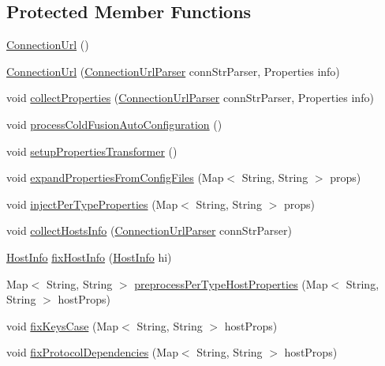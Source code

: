 \subsection*{Protected Member Functions}
\begin{DoxyCompactItemize}
\item 
\mbox{\hyperlink{classcom_1_1mysql_1_1cj_1_1conf_1_1_connection_url_ad72b3641e2d853e94c369c4706eb5c8b}{Connection\+Url}} ()
\item 
\mbox{\hyperlink{classcom_1_1mysql_1_1cj_1_1conf_1_1_connection_url_aea5acae1987c16d32135ad4be9eb5e1f}{Connection\+Url}} (\mbox{\hyperlink{classcom_1_1mysql_1_1cj_1_1conf_1_1_connection_url_parser}{Connection\+Url\+Parser}} conn\+Str\+Parser, Properties info)
\item 
void \mbox{\hyperlink{classcom_1_1mysql_1_1cj_1_1conf_1_1_connection_url_a95514a35cecb2df9fd97562e37405447}{collect\+Properties}} (\mbox{\hyperlink{classcom_1_1mysql_1_1cj_1_1conf_1_1_connection_url_parser}{Connection\+Url\+Parser}} conn\+Str\+Parser, Properties info)
\item 
void \mbox{\hyperlink{classcom_1_1mysql_1_1cj_1_1conf_1_1_connection_url_a30a037d919173bb9304abc41125093ce}{process\+Cold\+Fusion\+Auto\+Configuration}} ()
\item 
void \mbox{\hyperlink{classcom_1_1mysql_1_1cj_1_1conf_1_1_connection_url_a1c0bd7599f4e19698b01e25e11fc4686}{setup\+Properties\+Transformer}} ()
\item 
void \mbox{\hyperlink{classcom_1_1mysql_1_1cj_1_1conf_1_1_connection_url_a1029263b45f093075865f542e2d0fe87}{expand\+Properties\+From\+Config\+Files}} (Map$<$ String, String $>$ props)
\item 
void \mbox{\hyperlink{classcom_1_1mysql_1_1cj_1_1conf_1_1_connection_url_a7898c43cc847ca9819dfc98d96089563}{inject\+Per\+Type\+Properties}} (Map$<$ String, String $>$ props)
\item 
void \mbox{\hyperlink{classcom_1_1mysql_1_1cj_1_1conf_1_1_connection_url_acab0ee9a544e643d843f1d1e82052a0b}{collect\+Hosts\+Info}} (\mbox{\hyperlink{classcom_1_1mysql_1_1cj_1_1conf_1_1_connection_url_parser}{Connection\+Url\+Parser}} conn\+Str\+Parser)
\item 
\mbox{\hyperlink{classcom_1_1mysql_1_1cj_1_1conf_1_1_host_info}{Host\+Info}} \mbox{\hyperlink{classcom_1_1mysql_1_1cj_1_1conf_1_1_connection_url_a774f5a5e265ff12c8ea94e1c380e1b7a}{fix\+Host\+Info}} (\mbox{\hyperlink{classcom_1_1mysql_1_1cj_1_1conf_1_1_host_info}{Host\+Info}} hi)
\item 
Map$<$ String, String $>$ \mbox{\hyperlink{classcom_1_1mysql_1_1cj_1_1conf_1_1_connection_url_a7fd201bea071685e2344dc0701b0fb21}{preprocess\+Per\+Type\+Host\+Properties}} (Map$<$ String, String $>$ host\+Props)
\item 
void \mbox{\hyperlink{classcom_1_1mysql_1_1cj_1_1conf_1_1_connection_url_a20a83e5fed9728cf3fa6c727278975aa}{fix\+Keys\+Case}} (Map$<$ String, String $>$ host\+Props)
\item 
void \mbox{\hyperlink{classcom_1_1mysql_1_1cj_1_1conf_1_1_connection_url_af9876d27316cbfee270a60d576c4b7c8}{fix\+Protocol\+Dependencies}} (Map$<$ String, String $>$ host\+Props)
\end{DoxyCompactItemize}
